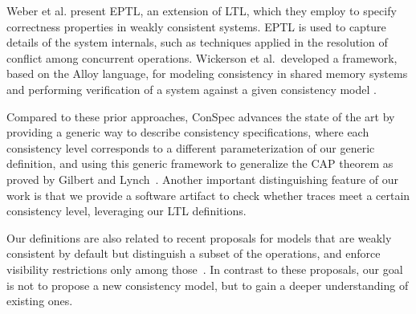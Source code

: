 \documentclass[journal,compsoc]{IEEEtran}
\begin{document}
 Weber et al. \cite{Weber2017} present EPTL, an extension of LTL,  which they employ to specify correctness properties in weakly consistent systems. EPTL is used to capture  details of the system internals, such as techniques applied in the resolution of conflict among concurrent operations. Wickerson et al.\ developed a framework, based on the Alloy language, for modeling consistency in shared memory systems and performing verification of a system against a given consistency model  \cite{Wickerson:2017:ACM:3009837.3009838}.


Compared to these prior approaches, ConSpec advances the state of the art by providing a generic way to describe consistency specifications, where each consistency level corresponds to a different parameterization of our generic definition, and using this generic framework to generalize the CAP theorem as proved by Gilbert and Lynch~\cite{Gilbert:2002:BCF:564585.564601}. Another important distinguishing feature of our work is that we provide a software artifact to check whether traces meet a certain consistency level, leveraging our LTL definitions. %

Our definitions are also related to recent proposals for models that are weakly consistent by default but distinguish a subset of the operations, and enforce visibility restrictions only among those~\cite{Li:2012:MGS:2387880.2387906, Gotsman:2016:CIS:2837614.2837625, cheng-papoc}. In contrast to these proposals, our goal is not to propose a new consistency model, but to gain a deeper understanding of existing ones.
\end{document}
